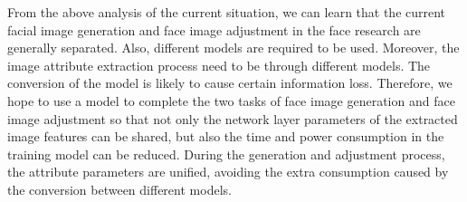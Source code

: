 \vspace{3ex}

From the above analysis of the current situation,
    we can learn that the current facial image generation and face image adjustment in the face research are generally separated.
Also, different models are required to be used.
Moreover, the image attribute extraction process need to be through different models. 
The conversion of the model is likely to cause certain information loss.
Therefore, we hope to use a model to complete the two tasks of face image generation and face image adjustment so that not only the network layer parameters of the extracted image features can be shared,
    but also the time and power consumption in the training model can be reduced. 
During the generation and adjustment process, the attribute parameters are unified,
    avoiding the extra consumption caused by the conversion between different models.